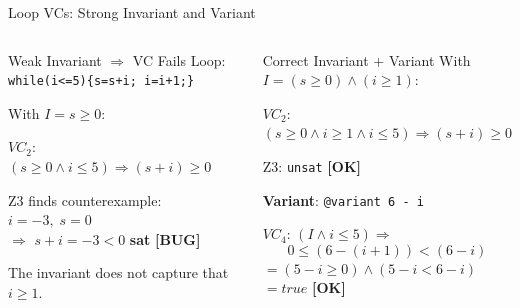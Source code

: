 \documentclass[aspectratio=169,11pt]{beamer}
\newcommand{\ok}{\textcolor{accent}{\textbf{[OK]}}}
\newcommand{\bug}{\textcolor{warn}{\textbf{[BUG]}}}
\begin{document}
\begin{frame}{Loop VCs: Strong Invariant and Variant}

\begin{columns}[t]
  \begin{alertblock}{Weak Invariant $\Rightarrow$ VC Fails}
    \medskip
    Loop: \texttt{while(i<=5)\{s=s+i; i=i+1;\}}

    \medskip
    With $I = s \geq 0$:

    \medskip
    $\mathit{VC}_2$: $(s\!\geq\!0 \wedge i\!\leq\!5) \Rightarrow (s+i) \geq 0$

    \medskip
    Z3 finds counterexample: $i = -3,\; s = 0$\\
    $\Rightarrow$ $s + i = -3 < 0$ \quad\textcolor{warn}{\textbf{sat}} \bug

    \medskip
    The invariant does not capture that $i \geq 1$.
    \medskip
  \end{alertblock}

  \begin{exampleblock}{Correct Invariant + Variant}
    \medskip
    With $I = (s \geq 0) \wedge (i \geq 1)$:

    \medskip
    $\mathit{VC}_2$: $(s\!\geq\!0 \wedge i\!\geq\!1 \wedge i\!\leq\!5) \Rightarrow (s+i) \geq 0$

    \medskip
    Z3: \texttt{unsat} \ok

    \vspace{0.3cm}
    \textbf{Variant}: \texttt{@variant 6 - i}

    \medskip
    $\mathit{VC}_4$: $(I \wedge i\!\leq\!5) \Rightarrow$
    \[ 0 \leq (6 - (i+1)) < (6-i) \]
    $= (5-i \geq 0) \wedge (5-i < 6-i)$
    $= \mathit{true}$ \ok
    \medskip
  \end{exampleblock}
\end{columns}
\end{frame}
\end{document}
